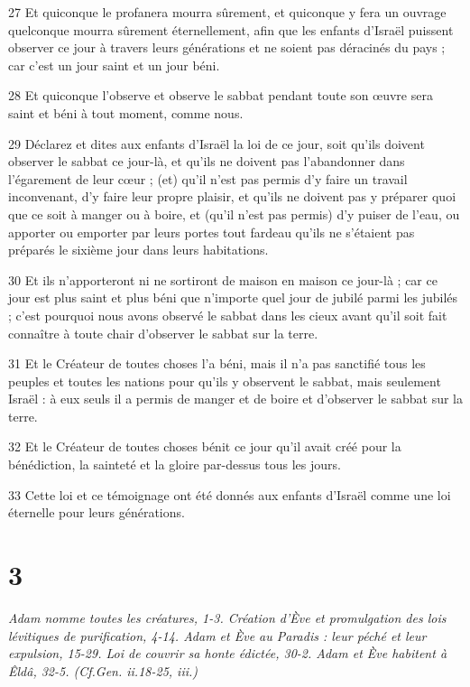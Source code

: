 \par 27 Et quiconque le profanera mourra sûrement, et quiconque y fera un ouvrage quelconque mourra sûrement éternellement, afin que les enfants d'Israël puissent observer ce jour à travers leurs générations et ne soient pas déracinés du pays ; car c'est un jour saint et un jour béni.
\par 28 Et quiconque l'observe et observe le sabbat pendant toute son œuvre sera saint et béni à tout moment, comme nous.
\par 29 Déclarez et dites aux enfants d'Israël la loi de ce jour, soit qu'ils doivent observer le sabbat ce jour-là, et qu'ils ne doivent pas l'abandonner dans l'égarement de leur cœur ; (et) qu'il n'est pas permis d'y faire un travail inconvenant, d'y faire leur propre plaisir, et qu'ils ne doivent pas y préparer quoi que ce soit à manger ou à boire, et (qu'il n'est pas permis) d'y puiser de l'eau, ou apporter ou emporter par leurs portes tout fardeau qu'ils ne s'étaient pas préparés le sixième jour dans leurs habitations.
\par 30 Et ils n'apporteront ni ne sortiront de maison en maison ce jour-là ; car ce jour est plus saint et plus béni que n'importe quel jour de jubilé parmi les jubilés ; c'est pourquoi nous avons observé le sabbat dans les cieux avant qu'il soit fait connaître à toute chair d'observer le sabbat sur la terre.
\par 31 Et le Créateur de toutes choses l'a béni, mais il n'a pas sanctifié tous les peuples et toutes les nations pour qu'ils y observent le sabbat, mais seulement Israël : à eux seuls il a permis de manger et de boire et d'observer le sabbat sur la terre.
\par 32 Et le Créateur de toutes choses bénit ce jour qu'il avait créé pour la bénédiction, la sainteté et la gloire par-dessus tous les jours.
\par 33 Cette loi et ce témoignage ont été donnés aux enfants d'Israël comme une loi éternelle pour leurs générations.

\chapter{3}

\par \textit{Adam nomme toutes les créatures, 1-3. Création d'Ève et promulgation des lois lévitiques de purification, 4-14. Adam et Ève au Paradis : leur péché et leur expulsion, 15-29. Loi de couvrir sa honte édictée, 30-2. Adam et Ève habitent à Êldâ, 32-5. (Cf.Gen. ii.18-25, iii.)}

